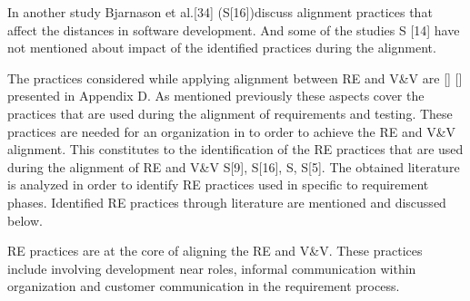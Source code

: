 \documentclass{article}
\begin{document}
In another study Bjarnason et al.[34] (S[16])discuss alignment practices that affect the distances in software development. And some of the studies S [14] have not mentioned about impact of the identified practices during the alignment.

The practices considered while applying alignment between RE and V\&V are \cite{barmi2011alignment} \cite{kukkanen2009applying} \cite{uusitalo2008linking} \cite{bjarnason2014challenges} [\cite{bjarnason2015industrial}] [\cite{bjarnason2014alignment}] presented in Appendix D. As mentioned previously these aspects cover the practices that are used during the alignment of requirements and testing. These practices are needed for an organization in to order to achieve the RE and V\&V alignment. This constitutes to the identification of the RE practices that are used during the alignment of RE and V\&V S[9], S[16], S\cite{bjarnason2014challenges}, S[5]. The obtained literature is analyzed in order to identify RE practices used in specific to requirement phases. Identified RE practices through literature are mentioned and discussed below.

RE practices are at the core of aligning the RE and V\&V\cite{bjarnason2014challenges}. These practices include involving development near roles, informal communication within organization and customer communication in the requirement process.
\end{document}
